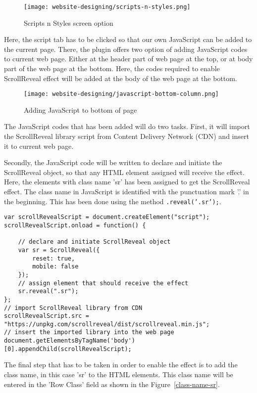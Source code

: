 \begin{figure}[h]
\centering
\caption{Scripts n Styles screen option}
\label{scripts-n-styles}
\texttt{[image: website-designing/scripts-n-styles.png]}
\end{figure}

Here, the script tab has to be clicked so that our own JavaScript can be added to the current page. There, the plugin offers two option of adding JavaScript codes to current web page. Either at the header part of web page at the top, or at body part of the web page at the bottom. Here, the codes required to enable ScrollReveal effect will be added at the body of the web page at the bottom.

\begin{figure}[h]
\centering
\caption{Adding JavaScript to bottom of page}
\label{javascript-bottom-column}
\texttt{[image: website-designing/javascript-bottom-column.png]}
\end{figure}

The JavaScript codes that has been added will do two tasks. First, it will import the ScrollReveal library script from Content Delivery Network (CDN) and insert it to current web page.

Secondly, the JavaScript code will be written to declare and initiate the ScrollReveal object, so that any HTML element assigned will receive the effect. Here, the elements with class name 'sr' has been assigned to get the ScrollReveal effect. The class name in JavaScript is identified with the punctuation mark '.' in the beginning. This has been done using the method \texttt{.reveal('.sr');}.

\begin{lstlisting}
var scrollRevealScript = document.createElement("script");
scrollRevealScript.onload = function() {

    // declare and initiate ScrollReveal object
    var sr = ScrollReveal({
        reset: true,
        mobile: false
    });
    // assign element that should receive the effect
    sr.reveal(".sr");
};
// import ScrollReveal library from CDN
scrollRevealScript.src = "https://unpkg.com/scrollreveal/dist/scrollreveal.min.js";
// insert the imported library into the web page
document.getElementsByTagName('body')[0].appendChild(scrollRevealScript);
\end{lstlisting}

The final step that has to be taken in order to enable the effect is to add the class name, in this case 'sr' to the HTML elements. This class name will be entered in the 'Row Class' field as shown in the Figure~\ref{class-name-sr}.

